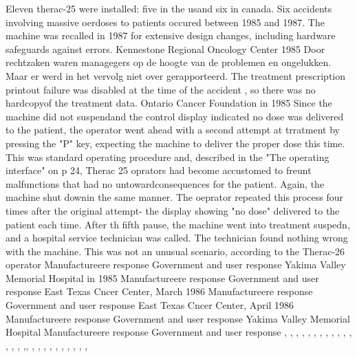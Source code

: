 Eleven therac-25 were installed: five in the usand six in canada. Six accidents involving massive oerdoses to patients occured between 1985 and 1987. The machine was recalled in 1987 for extensive design changes, including hardware	 safeguards against errors.
Kennestone Regional Oncology Center 1985
Door rechtzaken waren managegers op de hoogte van de problemen en ongelukken. Maar er werd in het vervolg niet over gerapporteerd.
The treatment prescription printout failure was disabled at the time of the accident , so there was no hardcopyof the treatment data.
Ontario Cancer Foundation in 1985
Since the machine did not suspendand the control display indicated no dose was delivered to the patient, the operator went ahead with a second attempt at trratment by pressing the "P" key, expecting the machine to deliver the proper dose this time. This was standard operating procedure and, described in the "The operating interface" on p 24, Therac 25
oprators had become accustomed to freunt malfunctions that had no untowardconsequences for the patient. Again, the machine shut downin the same manner. The oeprator repeated this process four times after the original attempt- the display showing "no dose" delivered to the patient each time. After th fifth pause, the machine went into treatment suspedn, and a  hospital service technician was called.
The technician found nothing wrong with the machine. This was not an unusual scenario, according to the Therac-26 operator
Manufactureere response
Government and user response
Yakima Valley Memorial Hospital in 1985
Manufactureere response
Government and user response
East Texas Cncer Center, March 1986
Manufactureere response
Government and user response
East Texas Cncer Center, April 1986
Manufactureere response
Government and user response
Yakima Valley Memorial Hospital
Manufactureere response
Government and user response
	\cite{rogaway2004therac25},
\cite{wikiTherac25}, 
\cite{lynch2017theracRaceConditions},	\cite{lim1998theracdisaster}, 
\cite{fabio26102015therac25},	 	\cite{ethicsunwrappedTherac25}, 	\cite{casesHistoryTherac25},	 	\cite{caballero2019Therac25}, 	\cite{rose1994theracFatalDose}, 	\cite{levesonMITTherac25},
\cite{grant1978theracevaluation},	 	\cite{turnerTheracAccidentsInvestigations},	\cite{turner1993TheracAccidentsInvestigations}, 	\cite{wang2017industrialdesignengineering}, 	\cite{levesonturner1993theracpart2},	\cite{porelloTheraccFailure},\cite{theracIncidents}, 
\cite{huffbrown2004casestudyethicatherac}, 
\cite{sebowikimedicalradiation},	\cite{hsia1995testtherac25},	\cite{magsilvaTheracTesting},
\cite{chemeuropetherac25},	\cite{statsenko10102016Therackillerbug},	\cite{therac25casestudy},	\cite{thomas1994theracinLotos},	\cite{twitter2019programmerbehindtherac},	\cite{wikibookstherac}, 
